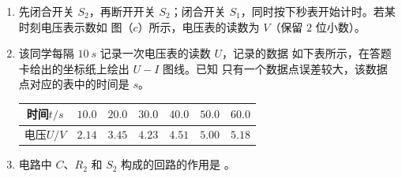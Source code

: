\begin{enumerate}
\begin{enumerate}
\item 
先闭合开关 $ S_{2} $，再断开开关 $ S_{2} $；闭合开关 $ S_{1} $，同时按下秒表开始计时。若某时刻电压表示数如
图（$ c $）所示，电压表的读数为 \underlinegap $ V $（保留 $ 2 $ 位小数）。

\item 
该同学每隔 $ 10 \ s $ 记录一次电压表的读数 $ U $，记录的数据
如下表所示，在答题卡给出的坐标纸上绘出 $ U-I $ 图线。已知
只有一个数据点误差较大，该数据点对应的表中的时间是
\underlinegap 
$ s $。
\begin{table}[h!]
\centering 
\begin{tabular}{|c|c|c|c|c|c|c|}
\hline 
时间$ t/s $ & $ 10.0 $ & $ 20.0 $ & $ 30.0 $ & $ 40.0 $ & $ 50.0 $ & $ 60.0 $
 \\
\hline
电压$ U/V $ & $ 2.14 $ & $ 3.45 $ & $ 4.23 $ & $ 4.51 $ & $ 5.00 $ & $ 5.18 $\\ 
\hline 
\end{tabular}
\end{table} 
\begin{figure}[h!]
\centering

\end{figure}





\item 
电路中 $ C $、$ R_{2} $ 和 $ S_{2} $ 构成的回路的作用是 \hfullline 。


\end{enumerate}






\end{enumerate}
